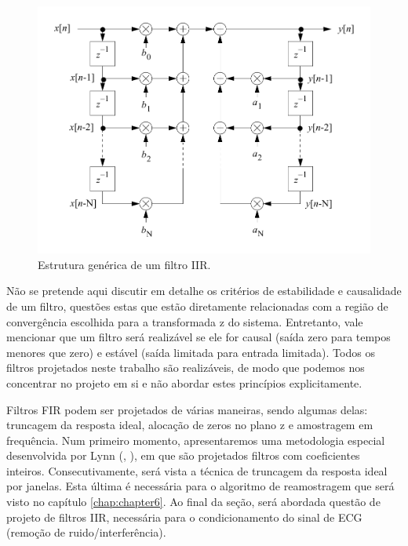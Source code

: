 \begin{figure}[ht!]
    \centering
    \includegraphics[width=400pt]{figures/chap3-iir-filter.pdf}
    \caption[Estrutura genérica de um filtro IIR]{Estrutura genérica de um filtro IIR.}
    \label{fig:iirfilter}
\end{figure}

Não se pretende aqui discutir em detalhe os critérios de estabilidade e causalidade de um filtro, questões estas que estão diretamente relacionadas com a região de convergência escolhida para a transformada z do sistema. Entretanto, vale mencionar que um filtro será realizável se ele for causal (saída zero para tempos menores que zero) e estável (saída limitada para entrada limitada). Todos os filtros projetados neste trabalho são realizáveis, de modo que podemos nos concentrar no projeto em si e não abordar estes princípios explicitamente.

Filtros FIR podem ser projetados de várias maneiras, sendo algumas delas: truncagem da resposta ideal, alocação de zeros no plano z e amostragem em frequência. Num primeiro momento, apresentaremos uma metodologia especial desenvolvida por Lynn (\cite{Lynn1971}, \cite{Lynn1977}), em que são projetados filtros com coeficientes inteiros. Consecutivamente, será vista a técnica de truncagem da resposta ideal por janelas. Esta última é necessária para o algoritmo de reamostragem que será visto no capítulo \ref{chap:chapter6}. Ao final da seção, será abordada questão de projeto de filtros IIR, necessária para o condicionamento do sinal de ECG (remoção de ruido/interferência).

